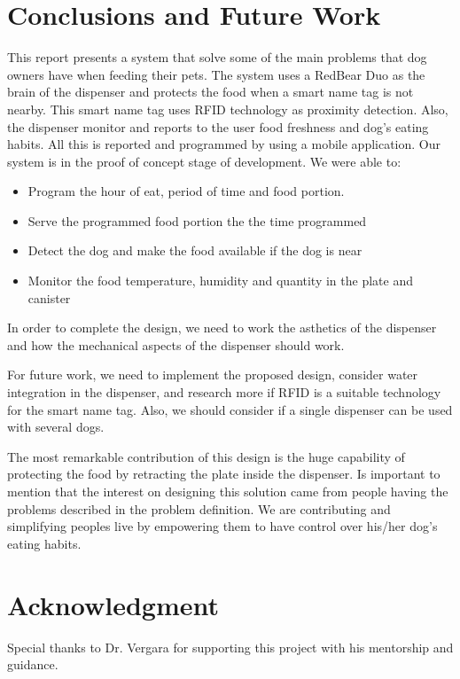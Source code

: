 \documentclass[12pt]{article}
\begin{document}
\section{Conclusions and Future Work}

This report presents a system that solve some of the main problems that dog owners have when feeding their pets. The system uses a RedBear Duo as the brain of the dispenser and protects the food when a smart name tag is not nearby. This smart name tag uses RFID technology as proximity detection. Also, the dispenser monitor and reports to the user food freshness and dog's eating habits. All this is reported and programmed by using a mobile application. Our system is in the proof of concept stage of development. We were able to:

\begin{itemize}
  \item Program the hour of eat, period of time and food portion.
  \item Serve the programmed food portion the the time programmed
  \item Detect the dog and make the food available if the dog is near
  \item Monitor the food temperature, humidity and quantity in the plate and canister
\end{itemize}

In order to complete the design, we need to work the asthetics of the dispenser and how the mechanical aspects of the dispenser should work.

For future work, we need to implement the proposed design, consider water integration in the dispenser, and research more if RFID is a suitable technology for the smart name tag. Also, we should consider if a single dispenser can be used with several dogs.

The most remarkable contribution of this design is the huge capability of protecting the food by retracting the plate inside the dispenser. Is important to mention that the interest on designing this solution came from people having the problems described in the problem definition. We are contributing and simplifying peoples live by empowering them to have control over his/her dog's eating habits.


\section*{Acknowledgment}

Special thanks to Dr. Vergara for supporting this project with his mentorship and guidance.
\end{document}
